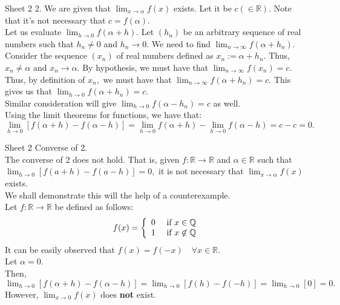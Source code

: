 \documentclass[handout, aspectratio=169]{beamer}
\begin{document}
\begin{frame}{Sheet 2}
	2. We are given that $\displaystyle\lim_{x\to \alpha}f(x)$ exists. Let it be $c (\in \mathbb{R}).$ Note that it's {\color[rgb]{1, 0, 0} not} necessary that $c = f(\alpha).$\\
	Let us evaluate $\displaystyle\lim_{h\to 0}f(\alpha + h).$ Let $(h_n)$ be an arbitrary sequence of real numbers such that $h_n \neq 0$ and $h_n \to 0.$ We need to find $\displaystyle\lim_{n\to \infty}f(\alpha + h_n).$\\
	Consider the sequence $(x_n)$ of real numbers defined as $x_n := \alpha + h_n.$ Thus, $x_n \neq \alpha$ and $x_n \to \alpha.$ By hypothesis, we must have that $\displaystyle\lim_{n\to \infty}f(x_n) = c.$\\
	Thus, by definition of $x_n,$ we must have that $\displaystyle\lim_{n\to \infty}f(\alpha + h_n) = c.$ This gives us that $\displaystyle\lim_{h\to 0}f(\alpha + h_n) = c.$\\
	Similar consideration will give $\displaystyle\lim_{h\to 0}f(\alpha - h_n) = c$ as well.\\
	Using the limit theorems for functions, we have that:
	\[\lim_{h\to 0}[f(\alpha + h) - f(\alpha - h)] = \lim_{h\to 0}f(\alpha+h) - \lim_{h\to 0}f(\alpha-h) = c - c = 0.\]	 
\end{frame}
\begin{frame}{Sheet 2}
	Converse of 2.\\
	The converse of 2 does {\color[rgb]{1, 0, 0} not} hold. That is, given $f:\mathbb{R} \to \mathbb{R}$ and $\alpha \in \mathbb{R}$ such that $\displaystyle\lim_{h\to 0}[f(a+h) - f(a-h)] = 0,$ it is not necessary that $\displaystyle\lim_{x\to \alpha}f(x)$ exists.\\
	We shall demonstrate this will the help of a counterexample.\\
	Let $f:\mathbb{R} \to \mathbb{R}$ be defined as follows:
	\[f(x) = \left\{
	\begin{array}[h]{c l}
		0 & \text{ if } x \in \mathbb{Q} \\
		1 & \text{ if } x \not\in \mathbb{Q}
	\end{array}
	\right.\]
	It can be easily observed that $f(x) = f(-x) \quad \forall x \in \mathbb{R}.$\\
	Let $\alpha = 0.$\\
	Then, $\displaystyle\lim_{h\to 0}[f(\alpha + h) - f(\alpha - h)] = \lim_{h\to 0}[f(h) - f(-h)] = \lim_{h\to 0}[0] = 0.$\\
	However, $\displaystyle\lim_{x\to 0}f(x)$ does \textbf{not} exist.
\end{frame}
\end{document}
